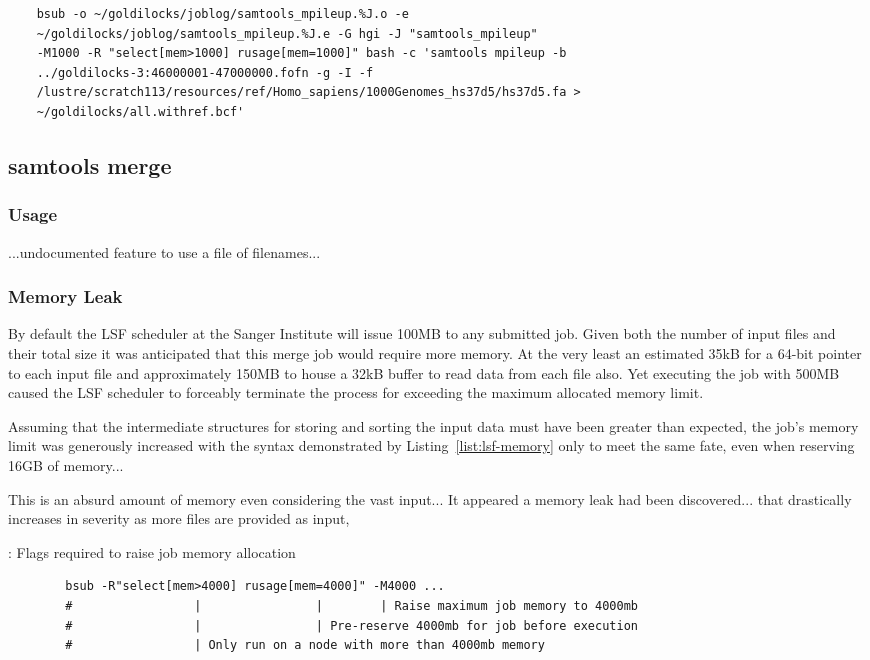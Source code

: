\begin{verbatim}
    bsub -o ~/goldilocks/joblog/samtools_mpileup.%J.o -e
    ~/goldilocks/joblog/samtools_mpileup.%J.e -G hgi -J "samtools_mpileup"
    -M1000 -R "select[mem>1000] rusage[mem=1000]" bash -c 'samtools mpileup -b
    ../goldilocks-3:46000001-47000000.fofn -g -I -f
    /lustre/scratch113/resources/ref/Homo_sapiens/1000Genomes_hs37d5/hs37d5.fa >
    ~/goldilocks/all.withref.bcf'
\end{verbatim}


\subsection{samtools merge}

\subsubsection{Usage}
...undocumented feature to use a file of filenames...

\subsubsection{Memory Leak}

By default the LSF scheduler at the Sanger Institute will issue 100MB to any
submitted job. Given both the number of input files and their total size it was
anticipated that this merge job would require more memory. At the very least an
estimated 35kB for a 64-bit pointer to each input file and approximately 150MB
to house a 32kB buffer to read data from each file also. Yet executing the job
with 500MB caused the LSF scheduler to forceably terminate the process for
exceeding the maximum allocated memory limit.

Assuming that the intermediate structures for storing and sorting the input data
must have been greater than expected, the job's memory limit was generously
increased with the syntax demonstrated by Listing~\ref{list:lsf-memory} only to
meet the same fate, even when reserving 16GB of memory...

This is an absurd amount of memory even considering the vast input...
It appeared a memory leak had been discovered...
that drastically increases in severity as more files are provided as input,

\begin{listing}[H]
    \caption[lsf-memory]{: Flags required to raise job memory allocation}
    \label{list:lsf-memory}
    \begin{verbatim}
        bsub -R"select[mem>4000] rusage[mem=4000]" -M4000 ...
        #                 |                |        | Raise maximum job memory to 4000mb
        #                 |                | Pre-reserve 4000mb for job before execution
        #                 | Only run on a node with more than 4000mb memory
    \end{verbatim}
\end{listing}

